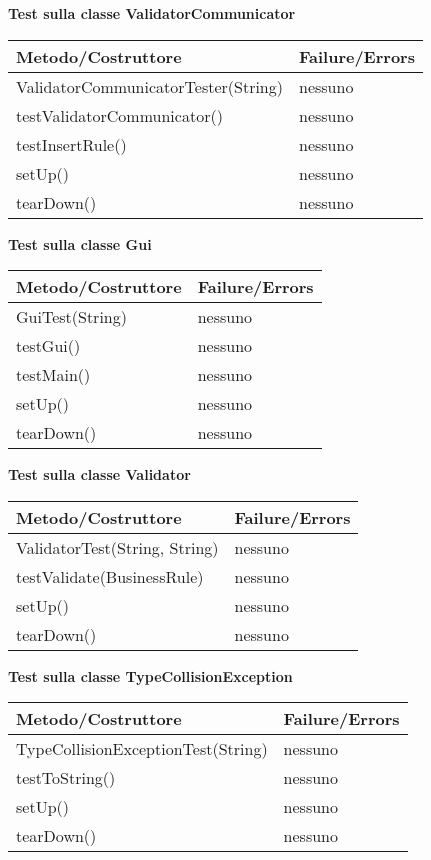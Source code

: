 \begin{center}
\textbf{Test sulla classe ValidatorCommunicator}\\
\begin{tabular}{|p{}|p{3 cm}|} \hline
\textbf{Metodo/Costruttore} & \textbf{Failure/Errors} \\ \hline
ValidatorCommunicatorTester(String) & nessuno \\ \hline
testValidatorCommunicator() & nessuno \\ \hline
testInsertRule() & nessuno \\ \hline
setUp() & nessuno \\ \hline
tearDown() & nessuno \\ \hline
\end{tabular}
\end{center}

\begin{center}
\textbf{Test sulla classe Gui}\\
\begin{tabular}{|p{}|p{3 cm}|} \hline
\textbf{Metodo/Costruttore} & \textbf{Failure/Errors} \\ \hline
GuiTest(String) & nessuno \\ \hline
testGui() & nessuno \\ \hline
testMain() & nessuno \\ \hline
setUp() & nessuno \\ \hline
tearDown() & nessuno \\ \hline
\end{tabular}
\end{center}

\begin{center}
\textbf{Test sulla classe Validator}\\
\begin{tabular}{|p{}|p{3 cm}|} \hline
\textbf{Metodo/Costruttore} & \textbf{Failure/Errors} \\ \hline
ValidatorTest(String, String) & nessuno \\ \hline
testValidate(BusinessRule) & nessuno \\ \hline
setUp() & nessuno \\ \hline
tearDown() & nessuno \\ \hline
\end{tabular}
\end{center}

\begin{center}
\textbf{Test sulla classe TypeCollisionException}\\
\begin{tabular}{|p{}|p{3 cm}|} \hline
\textbf{Metodo/Costruttore} & \textbf{Failure/Errors} \\ \hline
TypeCollisionExceptionTest(String) & nessuno \\ \hline
testToString() & nessuno \\ \hline
setUp() & nessuno \\ \hline
tearDown() & nessuno \\ \hline
\end{tabular}
\end{center}

